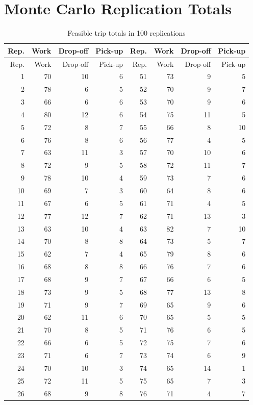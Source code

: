 \documentclass[11pt]{article}
\begin{document}
\section{Monte Carlo Replication Totals}\label{app:replications}
\begin{longtable}{r r r r r r r r}
\caption{Feasible trip totals in 100 replications}\\\toprule
Rep. & Work & Drop-off & Pick-up & Rep. & Work & Drop-off & Pick-up\\\midrule\endfirsthead
\toprule Rep. & Work & Drop-off & Pick-up & Rep. & Work & Drop-off & Pick-up\\\midrule\endhead
1 & 70 & 10 & 6 & 51 & 73 & 9 & 5\\
2 & 78 & 6 & 5 & 52 & 70 & 9 & 7\\
3 & 66 & 6 & 6 & 53 & 70 & 9 & 6\\
4 & 80 & 12 & 6 & 54 & 75 & 11 & 5\\
5 & 72 & 8 & 7 & 55 & 66 & 8 & 10\\
6 & 76 & 8 & 6 & 56 & 77 & 4 & 5\\
7 & 63 & 11 & 3 & 57 & 70 & 10 & 6\\
8 & 72 & 9 & 5 & 58 & 72 & 11 & 7\\
9 & 78 & 10 & 4 & 59 & 73 & 7 & 6\\
10 & 69 & 7 & 3 & 60 & 64 & 8 & 6\\
11 & 67 & 6 & 5 & 61 & 71 & 4 & 5\\
12 & 77 & 12 & 7 & 62 & 71 & 13 & 3\\
13 & 63 & 10 & 4 & 63 & 82 & 7 & 10\\
14 & 70 & 8 & 8 & 64 & 73 & 5 & 7\\
15 & 62 & 7 & 4 & 65 & 79 & 8 & 6\\
16 & 68 & 8 & 8 & 66 & 76 & 7 & 6\\
17 & 68 & 9 & 7 & 67 & 66 & 6 & 5\\
18 & 73 & 9 & 5 & 68 & 77 & 13 & 8\\
19 & 71 & 9 & 7 & 69 & 65 & 9 & 6\\
20 & 62 & 11 & 6 & 70 & 65 & 5 & 5\\
21 & 70 & 8 & 5 & 71 & 76 & 6 & 5\\
22 & 66 & 6 & 5 & 72 & 75 & 7 & 6\\
23 & 71 & 6 & 7 & 73 & 74 & 6 & 9\\
24 & 70 & 10 & 3 & 74 & 65 & 14 & 1\\
25 & 72 & 11 & 5 & 75 & 65 & 7 & 3\\
26 & 68 & 9 & 8 & 76 & 71 & 4 & 7\\

\end{longtable}
\end{document}
